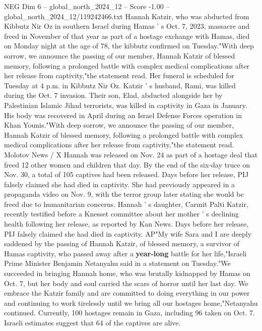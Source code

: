 \begin{textsample}{NEG Dim 6 – global\_north\_2024\_12 – Score -1.00 – global\_north\_2024\_12/119242466.txt}  \label{ex:f6_neg_177}
Hannah Katzir, who was abducted from Kibbutz Nir Oz in southern Israel during Hamas ' s Oct. 7, 2023, massacre and freed in November of that year as part of a hostage exchange with Hamas, died on Monday night at the age of 78, the kibbutz confirmed on Tuesday."With deep sorrow, we announce the passing of our member, Hannah Katzir of blessed memory, following a prolonged battle with complex medical complications after her release from captivity,"the statement read.
Her funeral is scheduled for Tuesday at 4 p.m. in Kibbutz Nir Oz.
Katzir ' s husband, Rami, was killed during the Oct. 7 invasion.
Their son, Elad, abducted alongside her by Palestinian Islamic Jihad terrorists, was killed in captivity in Gaza in January.
His body was recovered in April during an Israel Defense Forces operation in Khan Younis."With deep sorrow, we announce the passing of our member, Hannah Katzir of blessed memory, following a prolonged battle with complex medical complications after her release from captivity,"the statement read.
Molotov News / X Hannah was released on Nov. 24 as part of a hostage deal that freed 12 other women and children that day.
By the end of the six-day truce on Nov. 30, a total of 105 captives had been released.
Days before her release, PIJ falsely claimed she had died in captivity.
She had previously appeared in a propaganda video on Nov. 9, with the terror group later stating she would be freed due to humanitarian concerns.
Hannah ' s daughter, Carmit Palti Katzir, recently testified before a Knesset committee about her mother ' s declining health following her release, as reported by Kan News.
Days before her release, PIJ falsely claimed she had died in captivity.
AP"My wife Sara and I are deeply saddened by the passing of Hannah Katzir, of blessed memory, a survivor of Hamas captivity, who passed away after a \textbf{year-long} battle for her life,"Israeli Prime Minister Benjamin Netanyahu said in a statement on Tuesday."We succeeded in bringing Hannah home, who was brutally kidnapped by Hamas on Oct. 7, but her body and soul carried the scars of horror until her last day.
We embrace the Katzir family and are committed to doing everything in our power and continuing to work tirelessly until we bring all our hostages home,"Netanyahu continued.
Currently, 100 hostages remain in Gaza, including 96 taken on Oct. 7.
Israeli estimates suggest that 64 of the captives are alive.

\end{textsample}
